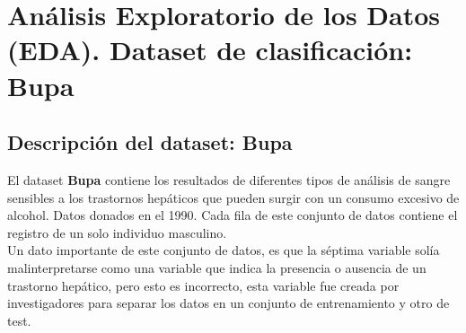 \chapter{Análisis Exploratorio de los Datos (EDA). Dataset de clasificación: Bupa}

\section{Descripción del dataset: Bupa}
El dataset \textbf{Bupa} contiene los resultados de diferentes tipos de análisis de sangre sensibles a los trastornos hepáticos que pueden surgir con un consumo excesivo de alcohol. Datos donados en el 1990. Cada fila de este conjunto de datos contiene el registro de un solo individuo masculino. \cite{5} \\

Un dato importante de este conjunto de datos, es que la séptima variable solía malinterpretarse como una variable que indica la presencia o ausencia de un trastorno hepático, pero esto es incorrecto, esta variable fue creada por investigadores para separar los datos en un conjunto de entrenamiento y otro de test.\\

